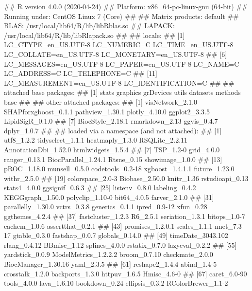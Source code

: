 \documentclass[]{article}
\renewenvironment{verbatim}{\color{codecolor}\begin{myshaded}\begin{oldverbatim}}{\end{oldverbatim}\end{myshaded}}
\begin{document}
\begin{verbatim}
## R version 4.0.0 (2020-04-24)
## Platform: x86_64-pc-linux-gnu (64-bit)
## Running under: CentOS Linux 7 (Core)
## 
## Matrix products: default
## BLAS:   /usr/local/lib64/R/lib/libRblas.so
## LAPACK: /usr/local/lib64/R/lib/libRlapack.so
## 
## locale:
##  [1] LC_CTYPE=en_US.UTF-8       LC_NUMERIC=C               LC_TIME=en_US.UTF-8        LC_COLLATE=en_US.UTF-8     LC_MONETARY=en_US.UTF-8   
##  [6] LC_MESSAGES=en_US.UTF-8    LC_PAPER=en_US.UTF-8       LC_NAME=C                  LC_ADDRESS=C               LC_TELEPHONE=C            
## [11] LC_MEASUREMENT=en_US.UTF-8 LC_IDENTIFICATION=C       
## 
## attached base packages:
## [1] stats     graphics  grDevices utils     datasets  methods   base     
## 
## other attached packages:
##  [1] visNetwork_2.1.0     SHAPforxgboost_0.1.1 pathview_1.30.1      plotly_4.10.0        ggplot2_3.3.5        LipidSigR_0.1.0     
##  [7] BiocStyle_2.18.1     rmarkdown_2.13       ggvis_0.4.7          dplyr_1.0.7         
## 
## loaded via a namespace (and not attached):
##   [1] utf8_1.2.2           tidyselect_1.1.1     heatmaply_1.3.0      RSQLite_2.2.11       AnnotationDbi_1.52.0 htmlwidgets_1.5.4   
##   [7] TSP_1.2-0            grid_4.0.0           ranger_0.13.1        BiocParallel_1.24.1  Rtsne_0.15           showimage_1.0.0     
##  [13] pROC_1.18.0          munsell_0.5.0        codetools_0.2-18     xgboost_1.4.1.1      future_1.23.0        withr_2.5.0         
##  [19] colorspace_2.0-3     Biobase_2.50.0       knitr_1.36           rstudioapi_0.13      stats4_4.0.0         ggsignif_0.6.3      
##  [25] listenv_0.8.0        labeling_0.4.2       KEGGgraph_1.50.0     polyclip_1.10-0      bit64_4.0.5          farver_2.1.0        
##  [31] parallelly_1.30.0    vctrs_0.3.8          generics_0.1.1       ipred_0.9-12         xfun_0.28            ggthemes_4.2.4      
##  [37] fastcluster_1.2.3    R6_2.5.1             seriation_1.3.1      bitops_1.0-7         cachem_1.0.6         assertthat_0.2.1    
##  [43] promises_1.2.0.1     scales_1.1.1         nnet_7.3-17          gtable_0.3.0         fastshap_0.0.7       globals_0.14.0      
##  [49] timeDate_3043.102    rlang_0.4.12         BBmisc_1.12          splines_4.0.0        rstatix_0.7.0        lazyeval_0.2.2      
##  [55] yardstick_0.0.9      ModelMetrics_1.2.2.2 broom_0.7.10         checkmate_2.0.0      BiocManager_1.30.16  yaml_2.3.5          
##  [61] reshape2_1.4.4       abind_1.4-5          crosstalk_1.2.0      backports_1.3.0      httpuv_1.6.5         Hmisc_4.6-0         
##  [67] caret_6.0-90         tools_4.0.0          lava_1.6.10          bookdown_0.24        ellipsis_0.3.2       RColorBrewer_1.1-2  

\end{verbatim}
\end{document}
